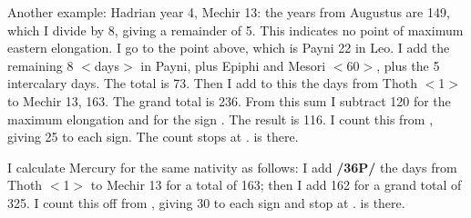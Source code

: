 Another example: Hadrian year 4, Mechir 13: the years from Augustus are 149, which I divide by 8, giving a remainder of 5. This indicates no point of maximum eastern elongation. I go to the point above, which is Payni 22 in Leo. I add the remaining 8 $<$days$>$ in Payni, plus Epiphi and Mesori $<$60$>$, plus the
5 intercalary days. The total is 73. Then I add to this the days from Thoth $<$1$>$ to Mechir 13, 163. The grand total is 236. From this sum I subtract 120 for the maximum elongation and for the sign \Leo. The result is 116. I count this from \Virgo, giving 25 to each sign. The count stops at \Capricorn\xspace 16\deg. \Venus\xspace is there.

I calculate Mercury for the same nativity as follows: I add \textbf{/36P/} the days from Thoth $<$1$>$ to Mechir 13 for a total of 163; then I add 162 for a grand total of 325. I count this off from \Aries, giving 30 to each sign and stop at \Aquarius\xspace 25\deg. \Mercury\xspace is there.

\newpage